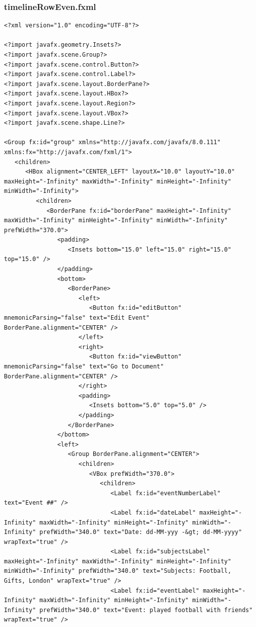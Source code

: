 \subsubsection{timelineRowEven.fxml}
\begin{lstlisting}
<?xml version="1.0" encoding="UTF-8"?>

<?import javafx.geometry.Insets?>
<?import javafx.scene.Group?>
<?import javafx.scene.control.Button?>
<?import javafx.scene.control.Label?>
<?import javafx.scene.layout.BorderPane?>
<?import javafx.scene.layout.HBox?>
<?import javafx.scene.layout.Region?>
<?import javafx.scene.layout.VBox?>
<?import javafx.scene.shape.Line?>

<Group fx:id="group" xmlns="http://javafx.com/javafx/8.0.111" xmlns:fx="http://javafx.com/fxml/1">
   <children>
      <HBox alignment="CENTER_LEFT" layoutX="10.0" layoutY="10.0" maxHeight="-Infinity" maxWidth="-Infinity" minHeight="-Infinity" minWidth="-Infinity">
         <children>
            <BorderPane fx:id="borderPane" maxHeight="-Infinity" maxWidth="-Infinity" minHeight="-Infinity" minWidth="-Infinity" prefWidth="370.0">
               <padding>
                  <Insets bottom="15.0" left="15.0" right="15.0" top="15.0" />
               </padding>
               <bottom>
                  <BorderPane>
                     <left>
                        <Button fx:id="editButton" mnemonicParsing="false" text="Edit Event" BorderPane.alignment="CENTER" />
                     </left>
                     <right>
                        <Button fx:id="viewButton" mnemonicParsing="false" text="Go to Document" BorderPane.alignment="CENTER" />
                     </right>
                     <padding>
                        <Insets bottom="5.0" top="5.0" />
                     </padding>
                  </BorderPane>
               </bottom>
               <left>
                  <Group BorderPane.alignment="CENTER">
                     <children>
                        <VBox prefWidth="370.0">
                           <children>
                              <Label fx:id="eventNumberLabel" text="Event ##" />
                              <Label fx:id="dateLabel" maxHeight="-Infinity" maxWidth="-Infinity" minHeight="-Infinity" minWidth="-Infinity" prefWidth="340.0" text="Date: dd-MM-yyy -&gt; dd-MM-yyyy" wrapText="true" />
                              <Label fx:id="subjectsLabel" maxHeight="-Infinity" maxWidth="-Infinity" minHeight="-Infinity" minWidth="-Infinity" prefWidth="340.0" text="Subjects: Football, Gifts, London" wrapText="true" />
                              <Label fx:id="eventLabel" maxHeight="-Infinity" maxWidth="-Infinity" minHeight="-Infinity" minWidth="-Infinity" prefWidth="340.0" text="Event: played football with friends" wrapText="true" />

\end{lstlisting}
